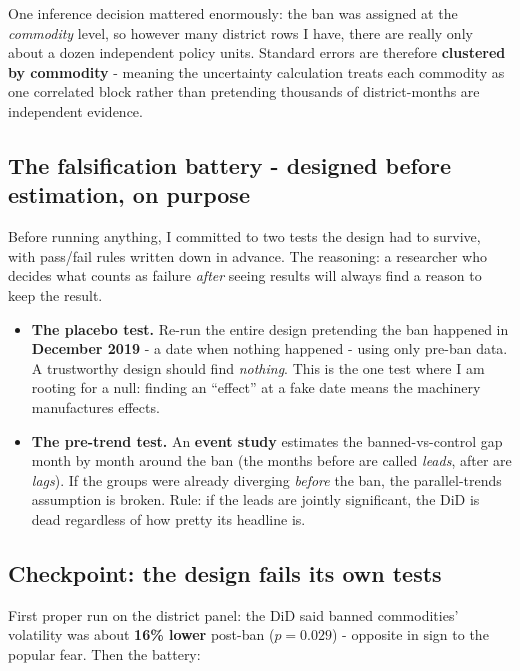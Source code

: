 \documentclass[11pt]{article}
\begin{document}
One inference decision mattered enormously: the ban was assigned at the \emph{commodity}
level, so however many district rows I have, there are really only about a dozen
independent policy units. Standard errors are therefore \textbf{clustered by commodity} -
meaning the uncertainty calculation treats each commodity as one correlated block rather
than pretending thousands of district-months are independent evidence.

\subsection{The falsification battery - designed before estimation, on purpose}

Before running anything, I committed to two tests the design had to survive, with pass/fail
rules written down in advance. The reasoning: a researcher who decides what counts as
failure \emph{after} seeing results will always find a reason to keep the result.

\begin{itemize}[leftmargin=1.8em,itemsep=1pt]
  \item \textbf{The placebo test.} Re-run the entire design pretending the ban happened in
        \textbf{December 2019} - a date when nothing happened - using only pre-ban data.
        A trustworthy design should find \emph{nothing}. This is the one test where I am
        rooting for a null: finding an ``effect'' at a fake date means the machinery
        manufactures effects.
  \item \textbf{The pre-trend test.} An \textbf{event study} estimates the banned-vs-control
        gap month by month around the ban (the months before are called \emph{leads}, after
        are \emph{lags}). If the groups were already diverging \emph{before} the ban, the
        parallel-trends assumption is broken. Rule: if the leads are jointly significant,
        the DiD is dead regardless of how pretty its headline is.
\end{itemize}

\subsection{Checkpoint: the design fails its own tests}

First proper run on the district panel: the DiD said banned commodities' volatility was
about \textbf{16\% lower} post-ban ($p=0.029$) - opposite in sign to the popular fear.
Then the battery:
\end{document}
